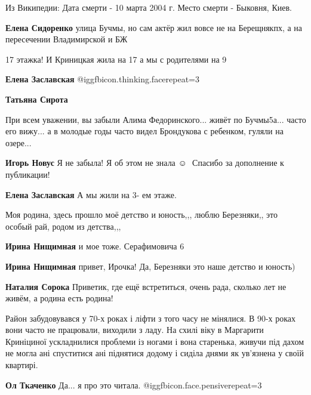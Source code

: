 \begin{itemize}
\begin{itemize}
\begin{itemize}
Из Википедии:
Дата смерти -
10 марта 2004 г.
Место смерти -
Быковня, Киев.

\end{itemize} %

\textbf{Елена Сидоренко} улица Бучмы, но сам актёр жил вовсе не на Берещнякпх, а на пересечении Владимирской и БЖ
\end{itemize} %

17 этажка! И Криницкая жила на 17 а мы с родителями на 9

\begin{itemize} %
\textbf{Елена Заславская}  @igg{fbicon.thinking.face}{repeat=3} 

\textbf{Татьяна Сирота} 

При всем уважении, вы забыли Алима Федоринского... живёт по Бучмы5а... часто его
вижу... а в молодые годы часто видел Брондукова с ребенком, гуляли на озере...


\textbf{Игорь Новус} 
Я не забыла! Я об этом не знала ☺ ️ 
Спасибо за дополнение к публикации!

\textbf{Елена Заславская}
А мы жили на 3- ем этаже.
\end{itemize} %

Моя родина, здесь прошло моё детство и юность,,, люблю Березняки,, это особый
рай, родом из детства,,,

\begin{itemize} %
\textbf{Ирина Нищимная} и мое тоже. Серафимовича 6

\textbf{Ирина Нищимная} привет, Ирочка! Да, Березняки это наше детство и юность)

\textbf{Наталия Сорока} Приветик, где ещё встретиться, очень рада, сколько лет не живём, а родина есть родина!
\end{itemize} %


Район забудовувався у 70-х роках і ліфти з того часу не мінялися. В 90-х роках
вони часто не працювали, виходили з ладу. На схилі віку в Маргарити Криніциної
ускладнилися проблеми із ногами і вона старенька, живучи під дахом не могла ані
спуститися ані піднятися додому і сиділа днями як ув’язнена у своїй квартирі.

\textbf{Ол Ткаченко} Да... я про это читала. @igg{fbicon.face.pensive}{repeat=3} 


\end{itemize}
